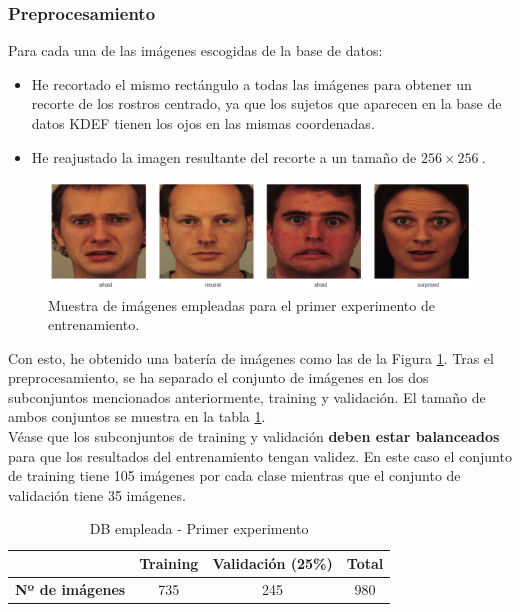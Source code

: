 \documentclass[a4paper,11pt]{book}
\begin{document}
\subsubsection{Preprocesamiento}
Para cada una de las imágenes escogidas de la base de datos:
\begin{itemize}
	\item He recortado el mismo rectángulo a todas las imágenes para obtener un recorte de los rostros centrado, ya que los sujetos que aparecen en la base de datos KDEF tienen los ojos en las mismas coordenadas.
	\item He reajustado la imagen resultante del recorte a un tamaño de \(256\times256\ \).
\end{itemize}

\begin{figure}[h]
	\centering
	\includegraphics[width=0.7\linewidth]{imagenes/primerIntentoDB}
	\caption[PrimerExperimentoDB]{Muestra de imágenes empleadas para el primer experimento de entrenamiento.}
	\label{fig:primerIntentoDB}
\end{figure}

Con esto, he obtenido una batería de imágenes como las de la Figura \ref{fig:primerIntentoDB}. Tras el preprocesamiento, se ha separado el conjunto de imágenes en los dos subconjuntos mencionados anteriormente, training y validación. El tamaño de ambos conjuntos se muestra en la tabla \ref{entr:PrimerIntento-DB}.\\
Véase que los subconjuntos de training y validación \textbf{deben estar balanceados} para que los resultados del entrenamiento tengan validez. En este caso el conjunto de training tiene 105 imágenes por cada clase mientras que el conjunto de validación tiene 35 imágenes.

\begin{table}[h]
	\centering
	\begin{tabular}{c|c|c|c|}
		\cline{2-4}
		& \textbf{Training} & \textbf{Validación} (25\%) & \textbf{Total} \\ \hline
		\multicolumn{1}{|c|}{\textbf{Nº de imágenes}} & 735        & 245          & 980     \\ \hline
	\end{tabular}
	\caption{DB empleada - Primer experimento}
	\label{entr:PrimerIntento-DB}
\end{table}
\end{document}
